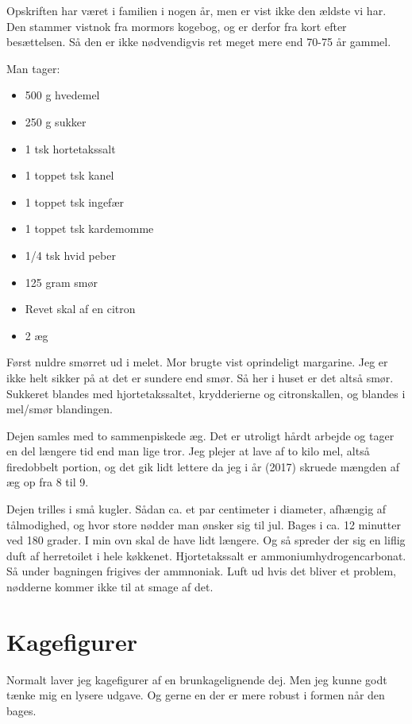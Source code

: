 \documentclass[
]{book}
\providecommand{\tightlist}{%
  \setlength{\itemsep}{0pt}\setlength{\parskip}{0pt}}
\begin{document}
Opskriften har været i familien i nogen år, men er vist ikke den ældste vi har. Den stammer vistnok fra mormors kogebog, og er derfor fra kort efter besættelsen. Så den er ikke nødvendigvis ret meget mere end 70-75 år gammel.

Man tager:

\begin{itemize}
\tightlist
\item
  500 g hvedemel
\item
  250 g sukker
\item
  1 tsk hortetakssalt
\item
  1 toppet tsk kanel
\item
  1 toppet tsk ingefær
\item
  1 toppet tsk kardemomme
\item
  1/4 tsk hvid peber
\item
  125 gram smør
\item
  Revet skal af en citron
\item
  2 æg
\end{itemize}

Først nuldre smørret ud i melet. Mor brugte vist oprindeligt margarine. Jeg er ikke helt sikker på at det er sundere end smør. Så her i huset er det altså smør. Sukkeret blandes med hjortetakssaltet, krydderierne og citronskallen, og blandes i mel/smør blandingen.

Dejen samles med to sammenpiskede æg. Det er utroligt hårdt arbejde og tager en del længere tid end man lige tror. Jeg plejer at lave af to kilo mel, altså firedobbelt portion, og det gik lidt lettere da jeg i år (2017) skruede mængden af æg op fra 8 til 9.

Dejen trilles i små kugler. Sådan ca. et par centimeter i diameter, afhængig af tålmodighed, og hvor store nødder man ønsker sig til jul. Bages i ca. 12 minutter ved 180 grader. I min ovn skal de have lidt længere. Og så spreder der sig en liflig duft af herretoilet i hele køkkenet. Hjortetakssalt er ammoniumhydrogencarbonat. Så under bagningen frigives der ammnoniak. Luft ud hvis det bliver et problem, nødderne kommer ikke til at smage af det.

\hypertarget{kagefigurer}{%
\section{Kagefigurer}\label{kagefigurer}}

Normalt laver jeg kagefigurer af en brunkagelignende dej. Men jeg kunne godt tænke mig en lysere udgave. Og gerne en der er mere robust i formen når den bages.
\end{document}
